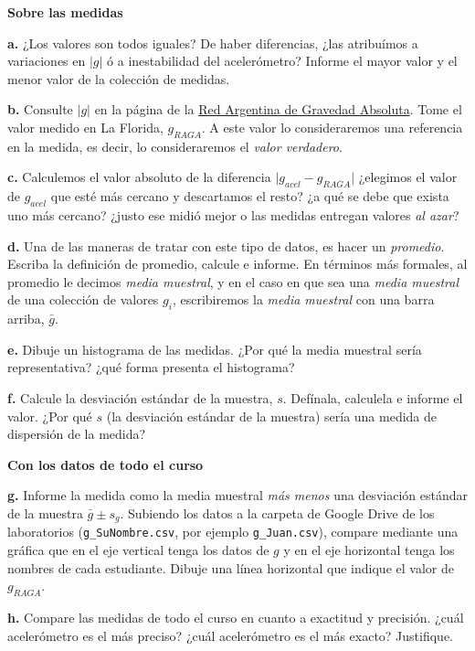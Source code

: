 \documentclass[10pt,a4paper]{article}
\numberwithin{equation}{section}%
\numberwithin{equation}{subsection}
\begin{document}
\textbf{Sobre las medidas}


\noindent \textbf{a.} ¿Los valores son todos iguales? De haber diferencias, ¿las atribuímos a variaciones en $|g|$ ó a inestabilidad del acelerómetro? Informe el mayor valor y el menor valor de la colección de medidas.

\noindent \textbf{b.} Consulte $|g|$ en la página de la \href{https://www.ign.gob.ar/NuestrasActividades/Geodesia/Gravimetria/RAGA}{Red Argentina de Gravedad Absoluta}. Tome el valor medido en La Florida, $g_{RAGA}$. A este valor lo consideraremos una referencia en la medida, es decir, lo consideraremos el \textit{valor verdadero}.

\noindent \textbf{c.} Calculemos el valor absoluto de la diferencia $\Big| g_{acel} - g_{RAGA}\Big|$ ¿elegimos el valor de $g_{acel}$ que esté más cercano y descartamos el resto? ¿a qué se debe que exista uno más cercano? ¿justo ese midió mejor o las medidas entregan valores \textit{al azar}?

\noindent \textbf{d.} Una de las maneras de tratar con este tipo de datos, es hacer un \textit{promedio}. Escriba la definición de promedio, calcule e informe. En términos más formales, al promedio le decimos \textit{media muestral}, y en el caso en que sea una \textit{media muestral} de una colección de valores $g_i$, escribiremos la \textit{media muestral} con una barra arriba, $\bar{g}$.

\noindent \textbf{e.} Dibuje un histograma de las medidas. ¿Por qué la media muestral sería representativa? ¿qué forma presenta el histograma?

\noindent \textbf{f.} Calcule la desviación estándar de la muestra, $s$. Defínala, calculela e informe el valor. ¿Por qué $s$ (la desviación estándar de la muestra) sería una medida de dispersión de la medida? 

\textbf{Con los datos de todo el curso}

\noindent \textbf{g.} Informe la medida como la media muestral \textit{más menos} una desviación estándar de la muestra $\bar{g} \pm s_g$. Subiendo los datos a la carpeta de Google Drive de los laboratorios (\texttt{g\_SuNombre.csv}, por ejemplo \texttt{g\_Juan.csv}), compare mediante una gráfica que en el eje vertical tenga los datos de $g$ y en el eje horizontal tenga los nombres de cada estudiante. Dibuje una línea horizontal que indique el valor de $g_{RAGA}$.

\noindent \textbf{h.} Compare las medidas de todo el curso en cuanto a exactitud y precisión. ¿cuál acelerómetro es el más preciso? ¿cuál acelerómetro es el más exacto? Justifique.
\end{document}
